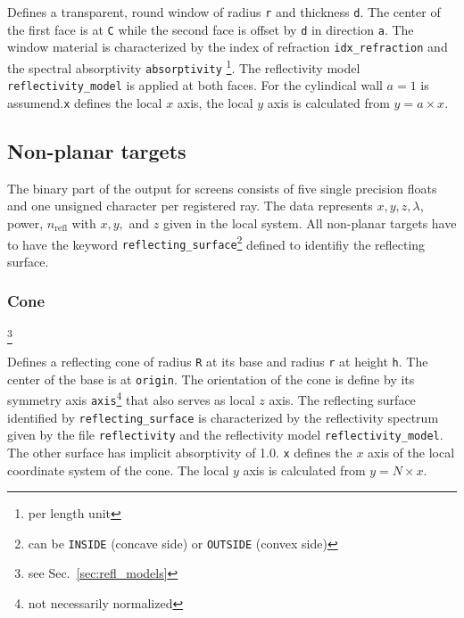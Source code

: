 \documentclass[10pt,a4paper,titlepage]{article}
\begin{document}
\vspace{0.25cm}
Defines a transparent, round window of radius {\tt r} and thickness {\tt d}. The center of the first face is at {\tt C} while the second face is offset by {\tt d} in direction {\tt a}. The window material is characterized by the index of refraction {\tt idx\_refraction} and the spectral absorptivity {\tt absorptivity} \footnote{per length unit}. The reflectivity model {\tt reflectivity\_model} is applied at both faces. For the cylindical wall $a=1$ is assumend.{\tt x} defines the local $x$ axis, the local $y$ axis is calculated from $y = a \times x$.



\subsection{Non-planar targets}

The binary part of the output for screens consists of five single precision floats and one unsigned character per registered ray. The data represents $x, y, z, \lambda$, power,  $n_{\mathrm{refl}}$ with $x, y,$ and $z$ given in the local system. All non-planar targets have to have the keyword {\tt reflecting\_surface}\footnote{can be {\tt INSIDE} (concave side) or {\tt OUTSIDE} (convex side)} defined to identifiy the reflecting surface.

\subsubsection{Cone}









\footnote{see Sec.~\ref{sec:refl_models}}


\vspace{0.25cm}
Defines a reflecting cone of radius {\tt R} at its base and radius {\tt r} at height {\tt h}. The center of the base is at {\tt origin}. The orientation of the cone is define by its symmetry axis {\tt axis}\footnote{not necessarily normalized} that also serves as local $z$ axis. The reflecting surface identified by {\tt reflecting\_surface} is characterized by the reflectivity spectrum given by the file {\tt reflectivity} and the reflectivity model {\tt reflectivity\_model}. The other surface has implicit absorptivity of 1.0. {\tt x} defines the $x$ axis of the local coordinate system of the cone. The local $y$ axis is calculated from $y = N \times x$.
\end{document}
